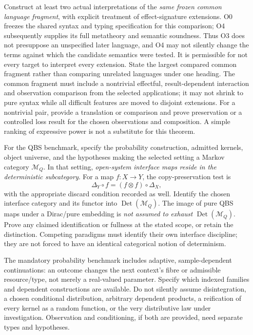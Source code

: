 \documentclass[11pt,a4paper]{article}
\newcommand{\Det}{\operatorname{Det}}
\begin{document}
Construct at least two actual interpretations of the \emph{same frozen common
language fragment}, with explicit treatment of effect-signature extensions.
O0 freezes the shared syntax and typing specification for this comparison;
O4 subsequently supplies its full metatheory and semantic soundness. Thus O3
does not presuppose an unspecified later language, and O4 may not silently
change the terms against which the candidate semantics were tested.
It is permissible for not every target to interpret every extension. State
the largest compared common fragment rather than comparing unrelated
languages under one heading. The common fragment must include a nontrivial
effectful, result-dependent interaction and observation comparison from the
selected applications; it may not shrink to pure syntax while all difficult
features are moved to disjoint extensions. For a nontrivial pair, provide a translation or
comparison and prove preservation or a controlled loss result for the chosen
observations and composition. A simple ranking of expressive power is not a
substitute for this theorem.

For the QBS benchmark, specify the probability construction, admitted kernels,
object universe, and the hypotheses making the selected setting a Markov
category \(\mathcal M_Q\). In that setting, \emph{open-system interface maps
reside in the deterministic subcategory}. For a map \(f:X\to Y\), the
copy-preservation test is
\[
 \Delta_Y\circ f=(f\otimes f)\circ\Delta_X,
\]
with the appropriate discard condition recorded as well. Identify the
chosen interface category and its functor into \(\Det(\mathcal M_Q)\).
The image of pure QBS maps under a Dirac/pure embedding is \emph{not assumed
to exhaust} \(\Det(\mathcal M_Q)\). Prove any claimed identification or
fullness at the stated scope, or retain the distinction. Competing paradigms
must identify their own interface discipline; they are not forced to have an
identical categorical notion of determinism.

The mandatory probability benchmark includes adaptive, sample-dependent
continuations: an outcome changes the next context's fibre or admissible
resource/type, not merely a real-valued parameter. Specify which indexed
families and dependent constructions are available. Do not silently assume
disintegration, a chosen conditional distribution, arbitrary dependent
products, a reification of every kernel as a random function, or the very
distributive law under investigation. Observation and conditioning, if both
are provided, need separate types and hypotheses.
\end{document}

